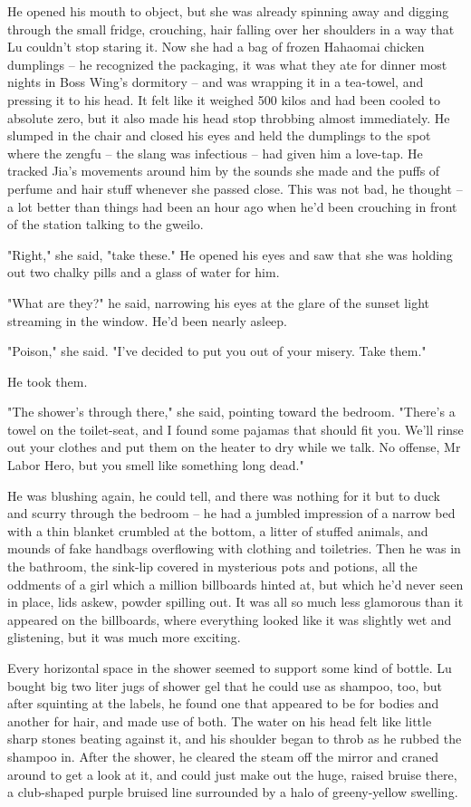 He opened his mouth to object, but she was already spinning away
and digging through the small fridge, crouching, hair falling over
her shoulders in a way that Lu couldn't stop staring it. Now she
had a bag of frozen Hahaomai chicken dumplings -- he recognized the
packaging, it was what they ate for dinner most nights in Boss
Wing's dormitory -- and was wrapping it in a tea-towel, and
pressing it to his head. It felt like it weighed 500 kilos and had
been cooled to absolute zero, but it also made his head stop
throbbing almost immediately. He slumped in the chair and closed
his eyes and held the dumplings to the spot where the zengfu -- the
slang was infectious -- had given him a love-tap. He tracked Jia's
movements around him by the sounds she made and the puffs of
perfume and hair stuff whenever she passed close. This was not bad,
he thought -- a lot better than things had been an hour ago when
he'd been crouching in front of the station talking to the gweilo.

"Right," she said, "take these." He opened his eyes and saw that
she was holding out two chalky pills and a glass of water for him.

"What are they?" he said, narrowing his eyes at the glare of the
sunset light streaming in the window. He'd been nearly asleep.

"Poison," she said. "I've decided to put you out of your misery.
Take them."

He took them.

"The shower's through there," she said, pointing toward the
bedroom. "There's a towel on the toilet-seat, and I found some
pajamas that should fit you. We'll rinse out your clothes and put
them on the heater to dry while we talk. No offense, Mr Labor Hero,
but you smell like something long dead."

He was blushing again, he could tell, and there was nothing for it
but to duck and scurry through the bedroom -- he had a jumbled
impression of a narrow bed with a thin blanket crumbled at the
bottom, a litter of stuffed animals, and mounds of fake handbags
overflowing with clothing and toiletries. Then he was in the
bathroom, the sink-lip covered in mysterious pots and potions, all
the oddments of a girl which a million billboards hinted at, but
which he'd never seen in place, lids askew, powder spilling out. It
was all so much less glamorous than it appeared on the billboards,
where everything looked like it was slightly wet and glistening,
but it was much more exciting.

Every horizontal space in the shower seemed to support some kind of
bottle. Lu bought big two liter jugs of shower gel that he could
use as shampoo, too, but after squinting at the labels, he found
one that appeared to be for bodies and another for hair, and made
use of both. The water on his head felt like little sharp stones
beating against it, and his shoulder began to throb as he rubbed
the shampoo in. After the shower, he cleared the steam off the
mirror and craned around to get a look at it, and could just make
out the huge, raised bruise there, a club-shaped purple bruised
line surrounded by a halo of greeny-yellow swelling.

